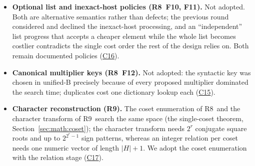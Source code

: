 \documentclass[11pt,oneside]{article}
\numberwithin{equation}{section}
\theoremstyle{definition}
\theoremstyle{remark}
\newcommand{\code}[1]{\texttt{\detokenize{#1}}}
\newcommand{\RVIII}{\textsf{R8}}
\newcommand{\RIX}{\textsf{R9}}
\newcommand{\Cc}[1]{\hyperref[c:#1]{\textsf{C#1}}}
\begin{document}
\begin{itemize}
\item \textbf{Optional list and inexact-host policies (\RVIII\ F10, F11).} Not adopted. Both are alternative semantics rather than defects; the previous round considered and declined the inexact-host processing, and an ``independent'' list progress that accepts a cheaper element while the whole list becomes costlier contradicts the single cost order the rest of the design relies on. Both remain documented policies (\Cc{16}).
\item \textbf{Canonical multiplier keys (\RVIII\ F12).} Not adopted: the syntactic key was chosen in unified-B precisely because \code{RootReduce} of every proposed multiplier dominated the search time; duplicates cost one dictionary lookup each (\Cc{15}).
\item \textbf{Character reconstruction (\RIX).} The coset enumeration of \RVIII\ and the character transform of \RIX\ search the same space (the single-coset theorem, Section~\ref{sec:math:coset}); the character transform needs $2^r$ conjugate square roots and up to $2^{2^r-1}$ sign patterns, whereas an integer relation per coset needs one numeric vector of length $|H|+1$. We adopt the coset enumeration with the relation stage (\Cc{17}).
\end{itemize}
\end{document}
